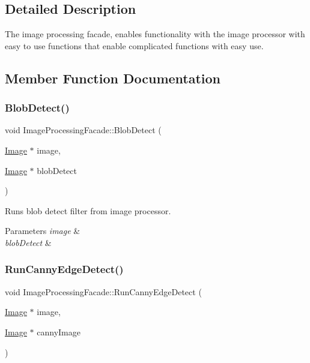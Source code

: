 \subsection{Detailed Description}
The image processing facade, enables functionality with the image processor with easy to use functions that enable complicated functions with easy use. 

\subsection{Member Function Documentation}
\mbox{\label{classImageProcessingFacade_ad65fe6e5f6db9aa5c45235b8e4486659}} 
\subsubsection{\texorpdfstring{Blob\+Detect()}{BlobDetect()}}
{\footnotesize\ttfamily void Image\+Processing\+Facade\+::\+Blob\+Detect (\begin{DoxyParamCaption}\item[{\hyperlink{classImage}{Image} $\ast$}]{image,  }\item[{\hyperlink{classImage}{Image} $\ast$}]{blob\+Detect }\end{DoxyParamCaption})\hspace{0.3cm}{\ttfamily [inline]}}



Runs blob detect filter from image processor. 


\begin{DoxyParams}{Parameters}
{\em image} & \\
\hline
{\em blob\+Detect} & \\
\hline
\end{DoxyParams}
\mbox{\label{classImageProcessingFacade_a320be6a053c96f9725f6526b0f4734c4}} 
\subsubsection{\texorpdfstring{Run\+Canny\+Edge\+Detect()}{RunCannyEdgeDetect()}}
{\footnotesize\ttfamily void Image\+Processing\+Facade\+::\+Run\+Canny\+Edge\+Detect (\begin{DoxyParamCaption}\item[{\hyperlink{classImage}{Image} $\ast$}]{image,  }\item[{\hyperlink{classImage}{Image} $\ast$}]{canny\+Image }\end{DoxyParamCaption})\hspace{0.3cm}{\ttfamily [inline]}}




